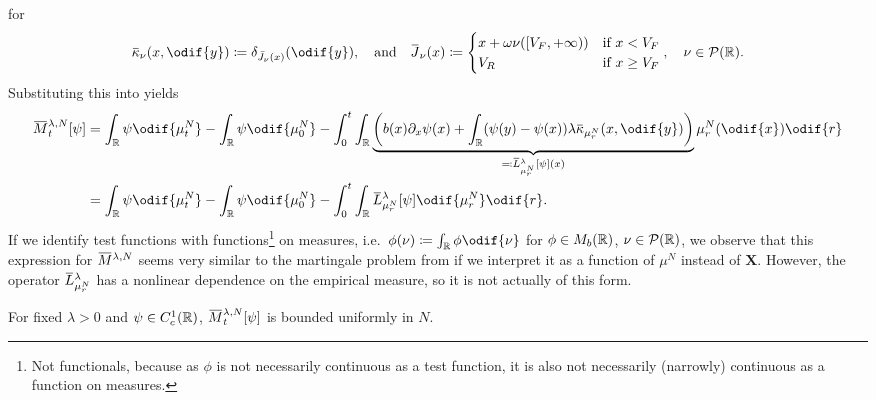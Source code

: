 for
\begin{equation}
  \ol{\kappa}_\nu(x, \odif{y}) \coloneqq \delta_{\bar{\jtarg}_\nu(x)}(\odif{y}),
  \quad\text{and}\quad
  \ol{\jtarg}_\nu(x) \coloneqq \begin{cases}
    x + \omega \nu([V_F,+\infty)) & \text{if } x < V_F    \\
    V_R                           & \text{if } x \geq V_F
  \end{cases}, \quad \nu \in \cP(\potspace).
\end{equation}
Substituting this into  yields
\begin{equation}\label{eq:emp-M-expression}
  \begin{split}
    \ol{M}_t^{\lambda, N}[\psi]
     & = \int_\potspace \psi \odif{\mu_t^N} - \int_\potspace \psi \odif{\mu_0^N}
    - \int_0^t \int_\potspace \underbrace{\br*{ b(x) \partial_x \psi(x) + \int_\potspace (\psi(y) - \psi(x)) \lambda \ol{\kappa}_{\mu_{r}^N}(x, \odif{y}) }}_{\eqqcolon \ol{L}_{\mu_{r}^N}^{\lambda} [\psi](x)} \mu_{r}^N(\odif{x}) \odif{r} \\
     & = \int_\potspace \psi \odif{\mu_t^N} - \int_\potspace \psi \odif{\mu_0^N}
    - \int_0^t \int_\potspace \ol{L}_{\mu_{r}^N}^{\lambda} [\psi] \odif{\mu_{r}^N} \odif{r}.
  \end{split}
\end{equation}
If we identify test functions with functions\footnote{Not functionals, because as \( \phi \) is not necessarily continuous as a test function, it is also not necessarily (narrowly) continuous as a function on measures.} on measures, i.e.\ \( \phi(\nu) \coloneqq \int_\potspace \phi \odif{\nu} \) for \(\phi \in M_b(\mathbb{R})\), \( \nu \in \mathcal{P}(\mathbb{R}) \), we observe that this expression for \(\ol{M}^{\lambda,N}\) seems very similar to the martingale problem from  if we interpret it as a function of \(\mu^N\) instead of \(\bm{X}\).
However, the operator \(\ol{L}_{\mu_{r}^N}^{\lambda}\) has a nonlinear dependence on the empirical measure, so it is not actually of this form.

\begin{lemma}\label{lem:emp-mart-bounded}
  For fixed \( \lambda > 0 \) and \( \psi \in C_c^1(\mathbb{R}) \), \( \ol{M}_t^{\lambda, N}[\psi] \) is bounded uniformly in \( N \).
\end{lemma}

